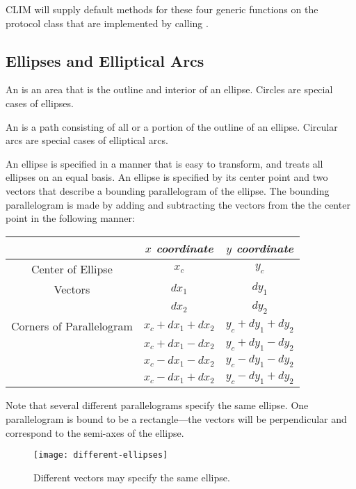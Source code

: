 CLIM will supply default methods for these four generic functions on the
protocol class  that are implemented by calling
.


\subsection {Ellipses and Elliptical Arcs}

An  is an area that is the outline and interior of an ellipse.
Circles are special cases of ellipses.

An  is a path consisting of all or a portion of the
outline of an ellipse.  Circular arcs are special cases of elliptical arcs.

An ellipse is specified in a manner that is easy to transform, and treats all
ellipses on an equal basis.  An ellipse is specified by its center point and two
vectors that describe a bounding parallelogram of the ellipse.  The bounding
parallelogram is made by adding and subtracting the vectors from the the center
point in the following manner:

\begin{tabular}{|c|cc|}
 \hline
   & {\sl $x$ coordinate} & {\sl $y$ coordinate} \\
 \hline
 Center of Ellipse & $x_c$ & $y_c$ \\
 \hline
 Vectors & $dx_1$ & $dy_1$ \\
         & $dx_2$ & $dy_2$ \\
 \hline
 Corners of Parallelogram & $x_c + dx_1 + dx_2$ & $y_c + dy_1 + dy_2$ \\
                          & $x_c + dx_1 - dx_2$ & $y_c + dy_1 - dy_2$ \\
                          & $x_c - dx_1 - dx_2$ & $y_c - dy_1 - dy_2$ \\
                          & $x_c - dx_1 + dx_2$ & $y_c - dy_1 + dy_2$ \\
 \hline
\end{tabular}

Note that several different parallelograms specify the same ellipse.  One
parallelogram is bound to be a rectangle---the vectors will be perpendicular
and correspond to the semi-axes of the ellipse.

\begin{figure}
\centerline{\texttt{[image: different-ellipses]}}
\caption{Different vectors may specify the same ellipse.}
\end{figure}

